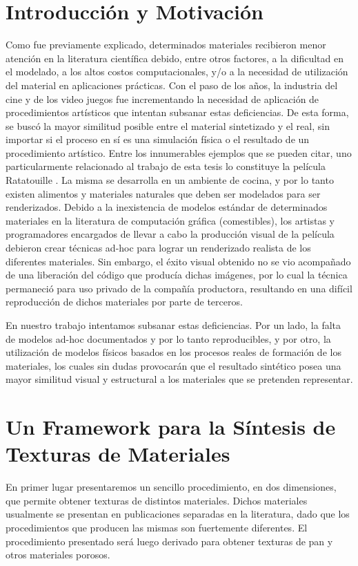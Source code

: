 \documentclass[spanish,a4paper,openright,11pt]{book}
\begin{document}
\section{Introducción y Motivación} %
Como fue previamente explicado, determinados materiales recibieron menor atención en la literatura científica debido, entre otros factores, a la dificultad en el modelado, a los altos costos computacionales, y/o a la necesidad de utilización del material en aplicaciones prácticas.
Con el paso de los a\~nos, la industria del cine y de los video juegos fue incrementando la necesidad de aplicación de procedimientos artísticos que intentan subsanar estas deficiencias.
De esta forma, se busc\'o la mayor similitud posible entre el material sintetizado y el real, sin importar si el proceso en sí es una simulación física o el resultado de un procedimiento artístico.
Entre los innumerables ejemplos que se pueden citar, uno particularmente relacionado al trabajo de esta tesis lo constituye la película Ratatouille \cite{Cho2007}.
La misma se desarrolla en un ambiente de cocina, y por lo tanto existen alimentos y materiales naturales que deben ser modelados para ser renderizados.
Debido a la inexistencia de modelos estándar de determinados materiales en la literatura de computación gráfica (comestibles), los artistas y programadores encargados de llevar a cabo la producción visual de la película debieron crear técnicas ad-hoc para lograr un renderizado realista de los diferentes materiales.
Sin embargo, el éxito visual obtenido no se vio acompañado de una liberación del código que producía dichas imágenes, por lo cual la técnica permaneció para uso privado de la compañía productora, resultando en una difícil reproducción de dichos materiales por parte de terceros.

En nuestro trabajo intentamos subsanar estas deficiencias.
Por un lado, la falta de modelos ad-hoc documentados y por lo tanto reproducibles, y por otro, la utilización de modelos físicos basados en los procesos reales de formación de los materiales, los cuales sin dudas provocarán que el resultado sintético posea una mayor similitud visual y estructural a los materiales que se pretenden representar.

\section{Un Framework para la Síntesis de Texturas de Materiales}
En primer lugar presentaremos un sencillo procedimiento, en dos dimensiones, que permite obtener texturas de distintos materiales.
Dichos materiales usualmente se presentan en publicaciones separadas en la literatura, dado que los procedimientos que producen las mismas son fuertemente diferentes.
El procedimiento presentado ser\'a luego derivado para obtener texturas de pan y otros materiales porosos.
\end{document}
